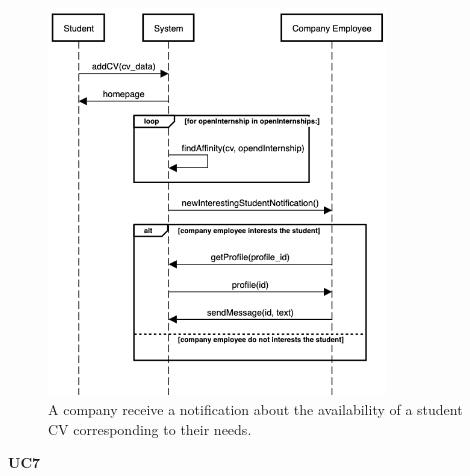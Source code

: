     \begin{figure}[H]
        \centering
        \includegraphics[width=0.8\textwidth]{RASD/Assets/SequenceDiagrams/6-matchmaking-new-student.png}
        \caption{A company receive a notification about the availability of a student CV corresponding to their needs.}
        \label{fig:A company receive a notification about the availability of a student CV corresponding to their needs}
    \end{figure}


    \textbf{UC7}
    
